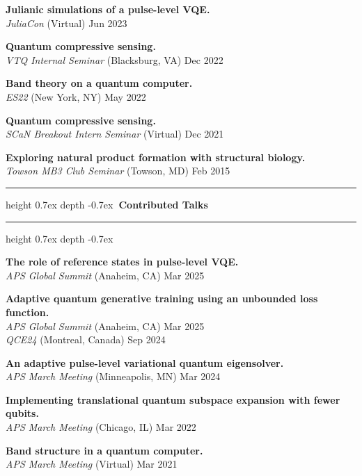 \documentclass[marginmode, 10pt]{res} %
\def\Vhrulefill{\leavevmode\leaders\hrule height 0.7ex depth \dimexpr0.4pt-0.7ex\hfill\kern0pt}         %
\begin{document}
\begin{resume}
\textbf{Julianic simulations of a pulse-level VQE.} \\
    \textit{JuliaCon} (Virtual) \hfill Jun 2023

\textbf{Quantum compressive sensing.} \\
    \textit{VTQ Internal Seminar} (Blacksburg, VA) \hfill Dec 2022

\textbf{Band theory on a quantum computer.} \\
    \textit{ES22} (New York, NY) \hfill May 2022

\textbf{Quantum compressive sensing.} \\
    \textit{SCaN Breakout Intern Seminar} (Virtual) \hfill Dec 2021

\textbf{Exploring natural product formation with structural biology.} \\
    \textit{Towson MB3 Club Seminar} (Towson, MD) \hfill Feb 2015



\Vhrulefill \textbf{~Contributed Talks~} \Vhrulefill


\textbf{The role of reference states in pulse-level VQE.} \\
    \textit{APS Global Summit} (Anaheim, CA) \hfill Mar 2025

\textbf{Adaptive quantum generative training using an unbounded loss function.} \\
    \textit{APS Global Summit} (Anaheim, CA) \hfill Mar 2025 \\
    \textit{QCE24} (Montreal, Canada) \hfill Sep 2024

\textbf{An adaptive pulse-level variational quantum eigensolver.} \\
    \textit{APS March Meeting} (Minneapolis, MN) \hfill Mar 2024

\textbf{Implementing translational quantum subspace expansion with fewer qubits.} \\
    \textit{APS March Meeting} (Chicago, IL) \hfill Mar 2022

\textbf{Band structure in a quantum computer.} \\
    \textit{APS March Meeting} (Virtual) \hfill Mar 2021


\end{resume}
\end{document}
